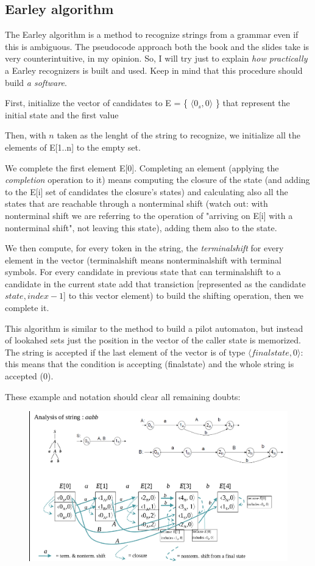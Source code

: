 		\subsection{Earley algorithm}
			The Earley algorithm is a method to recognize strings from a grammar even if this is ambiguous. The pseudocode approach both the book and the slides take 
			is very counterintuitive, in my opinion. So, I will try just to explain \emph{how practically} a Earley recognizers is built and used. Keep in mind that 
			this procedure should build \emph{a software}.

			First, initialize the vector of candidates to E = \{ $\langle 0_s, 0 \rangle$ \} that represent the initial state and the first value

			Then, with $n$ taken as the lenght of the string to recognize, we initialize all the elements of E[1..n] to the empty set.

			We complete the first element E[0]. Completing an element (applying the \emph{completion} operation to it) means computing the closure of the state (and 
			adding to the E[i] set of candidates the closure's states) and calculating also all the states that are reachable through a nonterminal shift (watch out: 
			with nonterminal shift we are referring to the operation of "arriving on E[i] with a nonterminal shift", not leaving this state), adding them also to the 
			state.

			We then compute, for every token in the string, the \emph{terminalshift} for every element in the vector (terminalshift means nonterminalshift with 
			terminal symbols. For every candidate in previous state that can terminalshift to a candidate in the current state add that transiction [represented as 
			the candidate $state, index - 1$] to this vector element) to build the shifting operation, then we complete it.

			This algorithm is similar to the method to build a pilot automaton, but instead of lookahed sets just the position in the vector of the caller state is 
			memorized. The string is accepted if the last element of the vector is of type $\langle finalstate, 0 \rangle$: this means that the condition is 
			accepting (finalstate) and the whole string is accepted (0).
			
			These example and notation should clear all remaining doubts:
			\begin{figure}[H]
				\centering
				\includegraphics[width = \textwidth]{./images/exEarley.png}
			\end{figure}